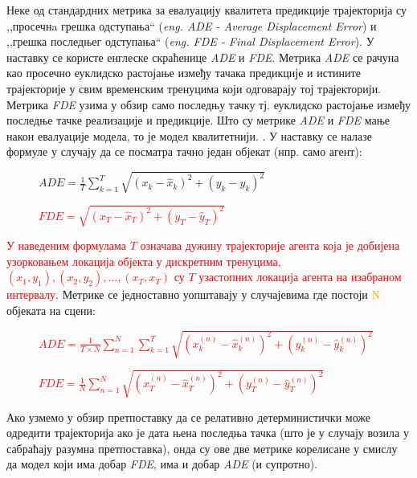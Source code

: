 \documentclass[11pt,oneside]{memoir}
\begin{document}
Неке од стандардних метрика за евалуацију квалитета предикције трајекторија су ,,просечнa грешка одступања`` (\textit{eng. ADE - Average Displacement Error})
и ,,грешка последњег одступања`` (\textit{eng. FDE - Final Displacement Error}). У наставку се користе енглеске скраћенице \textit{ADE} и
\textit{FDE}. Метрика \textit{ADE} се рачуна као просечно еуклидско растојање између тачака предикције и истините трајекторије у свим
временским тренуцима који одговарају тој трајекторији. 
Метрика \textit{FDE} узима у обзир само последњу тачку тј. еуклидско растојање између последње тачке реализације и предикције.
Што су метрике \textit{ADE} и \textit{FDE} мање након евалуације модела, то је модел квалитетнији. \cite{social_gan, argoverse}.  
У наставку се налазе формуле у случају да се посматра тачно један објекат (нпр. само агент):

\begin{figure}[H]
  \centering
  $ADE = \frac{1}{T}\sum_{k=1}^{T}\sqrt{(x_k - \hat{x}_k)^2 + (y_k - \hat{y}_k)^2}$
\end{figure}


\begin{figure}[H]
  \centering
  \textcolor{red}{$FDE = \sqrt{(x_{T} - \hat{x}_{T})^2 + (y_{T} - \hat{y}_{T})^2}$}
\end{figure}

\textcolor{red}{У наведеним формулама $T$ означава дужину трајекторије агента која је добијена узорковањем локација објекта у дискретним тренуцима, 
$(x_{1}, y_{1}), (x_{2}, y_{2}), ..., (x_{T}, x_{T})$ су $T$ узастопних локација агента на изабраном интервалу}. 
Метрике се једноставно уопштавају у случајевима где постоји \textcolor{orange}{N} објеката на сцени:

\begin{figure}[H]
  \centering
  \textcolor{red}{$ADE = \frac{1}{T\times N}\sum_{n=1}^{N}\sum_{k=1}^{T}\sqrt{(x^{(n)}_k - \hat{x}^{(n)}_k)^2 + (y^{(n)}_k - \hat{y}^{(n)}_k)^2}$}
\end{figure}

\begin{figure}[H]
  \centering
  \textcolor{red}{$FDE = \frac{1}{N}\sum_{n=1}^{N}\sqrt{(x^{(n)}_{T} - \hat{x}^{(n)}_{T})^2 + (y^{(n)}_{T} - \hat{y}^{(n)}_{T})^2}$}
\end{figure}

Ако узмемо у обзир претпоставку да се релативно детерминистички може одредити трајекторија ако је дата њена последња тачка 
(што је у случају возила у сабраћају разумна претпоставка), онда су ове две метрике корелисане у смислу да модел 
који има добар \textit{FDE}, има и добар \textit{ADE} (и супротно).
\end{document}

